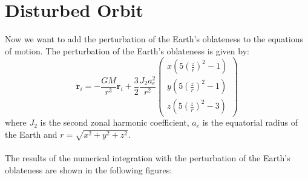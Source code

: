 \documentclass[12pt
,headinclude
,headsepline
,bibtotocnumbered
]{scrartcl}
\begin{document}
    \section*{Disturbed Orbit}
    Now we want to add the perturbation of the Earth's oblateness to the equations of motion. The perturbation of the Earth's oblateness is given by:
    \begin{equation*}
        \ddot{\textbf{r}}_i=-\frac{GM}{r^3}\textbf{r}_i+\frac{3}{2}\frac{J_2a_e^2}{r^2}\begin{pmatrix}
            x\left(5\left(\frac{z}{r}\right)^2-1\right)\\
            y\left(5\left(\frac{z}{r}\right)^2-1\right)\\
            z\left(5\left(\frac{z}{r}\right)^2-3\right)
        \end{pmatrix}
    \end{equation*}
    where $J_2$ is the second zonal harmonic coefficient, $a_e$ is the equatorial radius of the Earth and $r=\sqrt{x^2+y^2+z^2}$.
    \\\\
    The results of the numerical integration with the perturbation of the Earth's oblateness are shown in the following figures:
\end{document}
